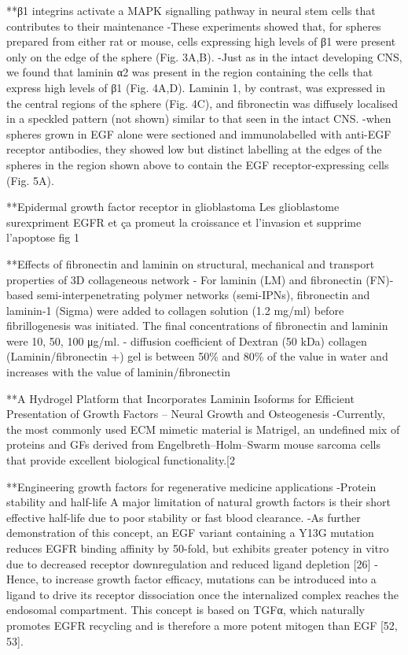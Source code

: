 \documentclass[11pt,a4paper]{article}
\begin{document}
**β1 integrins activate a MAPK signalling pathway in neural stem cells that contributes to their maintenance
-These experiments showed that, for spheres prepared from either rat or mouse, cells expressing high levels of β1 were present only on the edge of the sphere (Fig. 3A,B).
-Just as in the intact developing CNS, we found that laminin α2 was present in the region containing the cells that express high levels of β1 (Fig. 4A,D). Laminin 1, by contrast, was expressed in the central regions of the sphere (Fig. 4C), and fibronectin was diffusely localised in a speckled pattern (not shown) similar to that seen in the intact CNS. 
-when spheres grown in EGF alone were sectioned and immunolabelled with anti-EGF
receptor antibodies, they showed low but distinct labelling at the edges of the spheres in the region shown above to contain the EGF receptor-expressing cells (Fig. 5A). 

**Epidermal growth factor receptor in glioblastoma
Les glioblastome surexpriment EGFR et ça promeut la croissance et l'invasion et supprime l'apoptose fig 1

**Effects of fibronectin and laminin on structural, mechanical and transport properties of 3D collageneous network
- For laminin (LM) and fibronectin (FN)-based semi-interpenetrating polymer networks (semi-IPNs), fibronectin and laminin-1 (Sigma) were added to collagen solution (1.2 mg/ml) before fibrillogenesis was initiated. The final concentrations of fibronectin and laminin were 10, 50, 100 μg/ml.
- diffusion coefficient of Dextran (50 kDa) collagen (Laminin/fibronectin +) gel is between  50\% and 80\% of the value in water and increases with the value of  laminin/fibronectin

**A Hydrogel Platform that Incorporates Laminin Isoforms for Efficient Presentation of Growth Factors – Neural Growth and Osteogenesis
-Currently, the most commonly used ECM mimetic material is Matrigel, an undefined mix of proteins and GFs derived from Engelbreth–Holm–Swarm mouse sarcoma cells that provide excellent biological functionality.[2

**Engineering growth factors for regenerative medicine applications
-Protein stability and half-life
A major limitation of natural growth factors is their short effective half-life due to poor stability or fast blood clearance. 
-As further demonstration of this concept, an EGF variant containing a Y13G mutation reduces EGFR binding affinity by 50-fold, but exhibits greater potency in vitro due to decreased receptor downregulation and reduced ligand depletion [26]
- Hence, to increase growth factor efficacy, mutations can be introduced into a ligand to drive its receptor dissociation once the internalized complex reaches the endosomal compartment. This concept is based on TGFα, which naturally promotes EGFR recycling and is therefore a more potent mitogen than EGF [52, 53]. 
\end{document}
